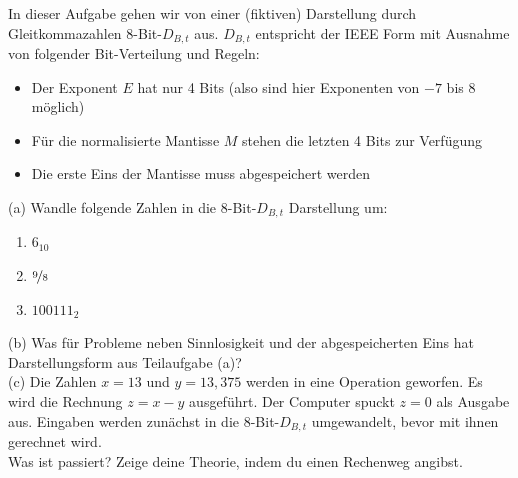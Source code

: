 \documentclass{scrartcl}
\begin{document}
	In dieser Aufgabe gehen wir von einer (fiktiven) Darstellung durch Gleitkommazahlen 8-Bit-$D_{B,t}$ aus. $D_{B,t}$ entspricht der IEEE Form mit Ausnahme von folgender Bit-Verteilung und Regeln:
	\begin{itemize}
		\item Der Exponent $E$ hat nur 4 Bits (also sind hier Exponenten von $-7$ bis $8$ möglich)
		\item Für die normalisierte Mantisse $M$ stehen die letzten 4 Bits zur Verfügung
		\item Die erste Eins der Mantisse muss abgespeichert werden
	\end{itemize}
	(a) 
	Wandle folgende Zahlen in die 8-Bit-$D_{B,t}$ Darstellung um:
	\begin{enumerate}
		\item $6_{10}$
		\item $\nicefrac{9}{8}$
		\item $100111_{2}$
	\end{enumerate}
		 \lbreak 
	(b) 
	Was für Probleme neben Sinnlosigkeit und der abgespeicherten Eins hat Darstellungsform aus Teilaufgabe (a)?
	\lbreak \\
	(c) 
	Die Zahlen $x = 13$ und $y = 13,375$ werden in eine Operation geworfen. Es wird die Rechnung $z = x - y$ ausgeführt. Der Computer spuckt $z = 0$ als Ausgabe aus. Eingaben werden zunächst in die 8-Bit-$D_{B,t}$ umgewandelt, bevor mit ihnen gerechnet wird. \sbreak \\
	Was ist passiert? Zeige deine Theorie, indem du einen Rechenweg angibst.
	
	
\end{document}
